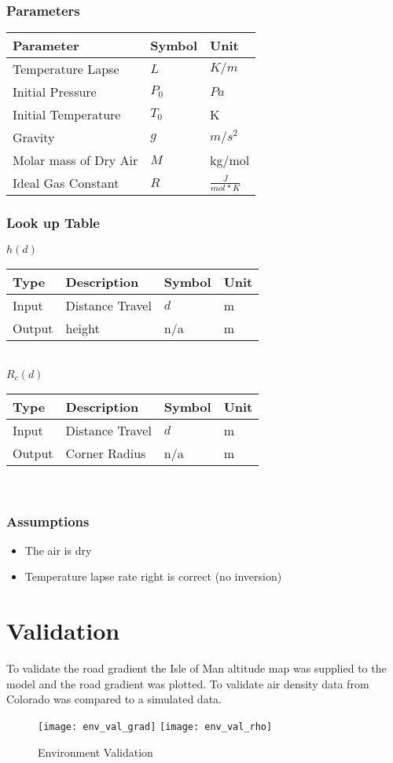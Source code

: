 \documentclass[../SimBALink.tex]{subfiles}
\begin{document}
\subsubsection{Parameters}
	\begin{tabular}{ l | l | l  }
		Parameter					&	Symbol		&	Unit		\\	\hline
		Temperature Lapse		&	$L$			&	 $K/m$ \\
		Initial Pressure 		&  $P_0$		&	$Pa$ \\
		Initial Temperature		&  $T_0$		&	K \\
		Gravity 				&  $g$			&  $m/s^2$ \\
		Molar mass of Dry Air	& $M$			&  kg/mol \\
		Ideal Gas Constant 		& $R$			& $\frac{J}{mol * K}$
	\end{tabular}
	
	\subsubsection{Look up Table}
	$h(d)$ \\
	\begin{tabular}{ l | l | l | l }
		Type				& Description		&	Symbol		&	Unit		\\	\hline
		Input 				& Distance Travel	&	$d$  		& m		\\
		Output 				& height 			&	n/a			&  m
	\end{tabular} \\
		$R_c(d)$ \\
	\begin{tabular}{ l | l | l | l }
		Type				& Description		&	Symbol		&	Unit		\\	\hline
		Input 				& Distance Travel	&	$d$  		& m		\\
		Output 				& Corner Radius 	&	n/a			&  m
	\end{tabular} \\
\subsubsection{Assumptions}
\begin{itemize}
  \item The air is dry 
  \item Temperature lapse rate right is correct (no inversion)
\end{itemize}

\section{Validation}

To validate the road gradient the Isle of Man altitude map was supplied to the model and the road gradient was plotted. To validate air density data from Colorado was compared to a simulated data.

\begin{figure}[H]
\center
 \texttt{[image: env\_val\_grad]}
 \texttt{[image: env\_val\_rho]}
  \caption{Environment Validation}
\end{figure}
\end{document}
